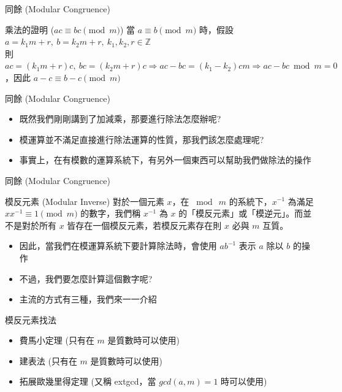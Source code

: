 \documentclass[aspectratio=169]{beamer}
\begin{document}
\begin{frame}{同餘 (Modular Congruence)}
    \begin{block}{乘法的證明 ($ac \equiv bc \pmod m$)}
        當 $a \equiv b \pmod m$ 時，假設 $a=k_1m + r, \ b = k_2m + r, \ k_1, k_2, r \in \mathbb{Z}$ \\
        \vspace{5mm}
        則 $ac = (k_1m+r)c, \ bc = (k_2m + r)c \Rightarrow ac-bc = (k_1-k_2)cm \Rightarrow ac-bc \bmod m = 0$，因此 $a-c \equiv b-c \pmod m$
    \end{block}
\end{frame}

\begin{frame}{同餘 (Modular Congruence)}
    \begin{itemize}
        \item 既然我們剛剛講到了加減乘，那要進行除法怎麼辦呢?
        \item 模運算並不滿足直接進行除法運算的性質，那我們該怎麼處理呢?
        \item 事實上，在有模數的運算系統下，有另外一個東西可以幫助我們做除法的操作
    \end{itemize}
\end{frame}

\begin{frame}{同餘 (Modular Congruence)}
    \begin{alertblock}{模反元素 (Modular Inverse)}
        對於一個元素 $x$，在 $\bmod \ m$ 的系統下，$x^{-1}$ 為滿足 $xx^{-1}\equiv 1 \pmod m$ 的數字，我們稱 $x^{-1}$ 為 $x$ 的「模反元素」或「模逆元」。而並不是對於所有 $x$ 皆存在一個模反元素，若模反元素存在則 $x$ 必與 $m$ 互質。
    \end{alertblock}
    \begin{itemize}
        \item<2-> 因此，當我們在模運算系統下要計算除法時，會使用 $ab^{-1}$ 表示 $a$ 除以 $b$ 的操作
        \item<3-> 不過，我們要怎麼計算這個數字呢?
        \item<4-> 主流的方式有三種，我們來一一介紹
    \end{itemize}
\end{frame}

\begin{frame}{模反元素找法}
    \begin{itemize}
        \item 費馬小定理 (只有在 $m$ 是質數時可以使用)
        \item 建表法 (只有在 $m$ 是質數時可以使用)
        \item 拓展歐幾里得定理 (又稱 extgcd，當 $gcd(a,m) = 1$ 時可以使用)
    \end{itemize}
\end{frame}
\end{document}
